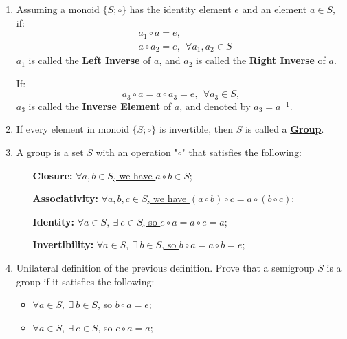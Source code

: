 \documentclass[12pt]{scrartcl}
\begin{document}
{{\begin{enumerate}[label=(\alph*)]
	\item 
	Assuming a monoid $\{S; \circ\}$ has the identity element $e$ and an element $a \in S$, if:
	\begin{align*}
	&a_1 \circ a = e,\\
	&a \circ a_2 = e, ~~\forall a_1, a_2 \in S
	\end{align*}	
	$a_1$ is called the \underline{\textbf{Left Inverse}\vphantom{g}} of $a$, and $a_2$ is called the \underline{\textbf{Right Inverse}} of $a$.

	If:
	$$a_3 \circ a = a \circ a_3 = e, ~~\forall a_3 \in S,$$
	$a_3$ is called the \underline{\textbf{Inverse Element}\vphantom{g}} of $a$, and denoted by $a_3 = a^{-1}.$ \\


	\item If every element in monoid $\{S; \circ\}$ is invertible, then $S$ is called a \underline{\textbf{Group}}. \\

\newpage

	\item A group is a set $S$ with an operation "$\circ$" that satisfies the following:
		
		\begin{itemize}[leftmargin=100pt]
		\item[\textbf{Closure: }] \underline{$\forall a, b \in S$, we have $a \circ b \in S$}; 
		\item[\textbf{Associativity: }] \underline{$\forall a, b, c \in S$, we have $(a \circ b) \circ c = a \circ (b \circ c)$};
		\item[\textbf{Identity: }] \underline{$\forall a \in S, ~ \exists ~ e \in S$, so $e \circ a = a \circ e = a$};
		\item[\textbf{Invertibility: }] \underline{$\forall a \in S, ~ \exists ~ b \in S$, so $b \circ a = a \circ b = e$}; \\
		\end{itemize} 


	\item Unilateral definition of the previous definition. Prove that a semigroup $S$ is a group if it satisfies the following: 
		
		\begin{itemize}[leftmargin=50pt]
		\item $\forall a \in S, ~ \exists ~ b \in S$, so $b \circ a = e$;
		\item $\forall a \in S, ~ \exists ~ e \in S$, so $e \circ a = a$; \\
		\end{itemize} 
	

\end{enumerate}}}
\end{document}
